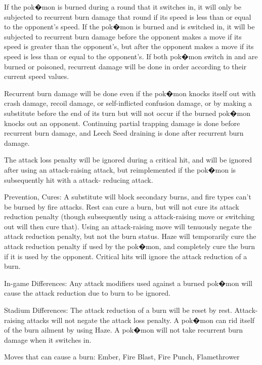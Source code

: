 \documentclass[reprint, aps, prl, paper=A4]{revtex4-1}
\begin{document}
If the pok�mon is burned during a round that it switches in, it will only be subjected to
recurrent burn damage that round if its speed is less than or equal to the opponent's speed. If
the pok�mon is burned and is switched in, it will be subjected to recurrent burn damage before
the opponent makes a move if its speed is greater than the opponent's, but after the opponent
makes a move if its speed is less than or equal to the opponent's. If both pok�mon switch in
and are burned or poisoned, recurrent damage will be done in order according to their current
speed values.

Recurrent burn damage will be done even if the pok�mon knocks itself out with crash damage,
recoil damage, or self-inflicted confusion damage, or by making a substitute before the end of
its turn but will not occur if the burned pok�mon knocks out an opponent. Continuing partial
trapping damage is done before recurrent burn damage, and Leech Seed draining is done after
recurrent burn damage.

The attack loss penalty will be ignored during a critical hit, and will be ignored after using
an attack-raising attack, but reimplemented if the pok�mon is subsequently hit with a attack-
reducing attack.

Prevention, Cures: A substitute will block secondary burns, and fire types can't be burned by
fire attacks. Rest can cure a burn, but will not cure its attack reduction penalty (though
subsequently using a attack-raising move or switching out will then cure that). Using an
attack-raising move will tenuously negate the attack reduction penalty, but not the burn
status. Haze will temporarily cure the attack reduction penalty if used by the pok�mon, and
completely cure the burn if it is used by the opponent. Critical hits will ignore the attack
reduction of a burn.

In-game Differences: Any attack modifiers used against a burned pok�mon will cause the attack
reduction due to burn to be ignored.

Stadium Differences: The attack reduction of a burn will be reset by rest. Attack-raising
attacks will not negate the attack loss penalty. A pok�mon can rid itself of the burn ailment
by using Haze. A pok�mon will not take recurrent burn damage when it switches in.

Moves that can cause a burn: Ember, Fire Blast, Fire Punch, Flamethrower
\end{document}
